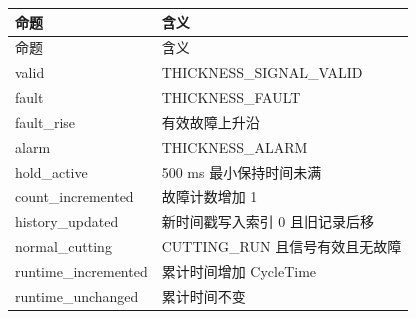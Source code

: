 \begin{longtable}{L{3.3cm}L{10.0cm}}

\toprule

命题 & 含义\\

\midrule

\endfirsthead

\toprule

命题 & 含义\\

\midrule

\endhead

{\ttfamily valid} & THICKNESS\_SIGNAL\_VALID\\

{\ttfamily fault} & THICKNESS\_FAULT\\

{\ttfamily fault\_rise} & 有效故障上升沿\\

{\ttfamily alarm} & THICKNESS\_ALARM\\

{\ttfamily hold\_active} & 500 ms 最小保持时间未满\\

{\ttfamily count\_incremented} & 故障计数增加 1\\

{\ttfamily history\_updated} & 新时间戳写入索引 0 且旧记录后移\\

{\ttfamily normal\_cutting} & CUTTING\_RUN 且信号有效且无故障\\

{\ttfamily runtime\_incremented} & 累计时间增加 CycleTime\\

{\ttfamily runtime\_unchanged} & 累计时间不变\\

\bottomrule

\end{longtable}

